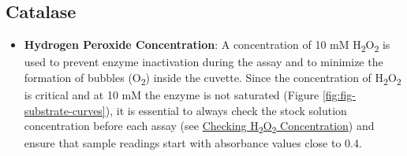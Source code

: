 \documentclass[
  9pt,
  american,
  a5paper,
  extrafontsizes,onecolumn,openright
  ]{memoir}
\providecommand{\tightlist}{%
  \setlength{\itemsep}{0pt}\setlength{\parskip}{0pt}}
\begin{document}
\subsection{Catalase}\label{catalase}

\begin{itemize}
\tightlist
\item
  \textbf{Hydrogen Peroxide Concentration}: A concentration of 10 mM H\textsubscript{2}O\textsubscript{2} is used to prevent enzyme inactivation during the assay and to minimize the formation of bubbles (O\textsubscript{2}) inside the cuvette. Since the concentration of H\textsubscript{2}O\textsubscript{2} is critical and at 10 mM the enzyme is not saturated (Figure \ref{fig:fig-substrate-curves}), it is essential to always check the stock solution concentration before each assay (see \hyperref[cat_checking_h2o2]{Checking H\textsubscript{2}O\textsubscript{2} Concentration}) and ensure that sample readings start with absorbance values close to 0.4.
\end{itemize}

\scriptsize
\end{document}
